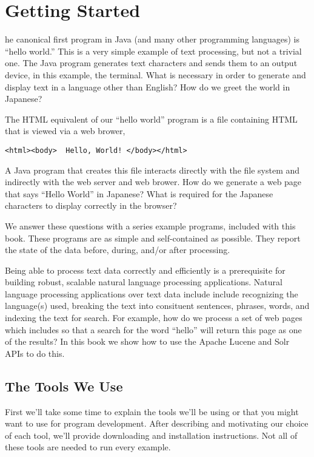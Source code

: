 \chapter{Getting Started}\label{chap:getting-started}

he canonical first program in Java (and many
other programming languages) is ``hello world.''
%
%
This is a very simple example of text processing, but not a trivial one.
The Java program generates text characters and sends them to an output device,
in this example, the terminal.
What is necessary in order to generate and display text in a language other than English?
How do we greet the world in Japanese?

The HTML equivalent of our ``hello world'' program is a file containing
HTML that is viewed via a web brower, 
\begin{verbatim}
<html><body>  Hello, World! </body></html>
\end{verbatim}
A Java program that creates this file interacts directly with the file system
and indirectly with the web server and web brower.  How do we generate a web page 
that says ``Hello World'' in Japanese?  What is required 
for the Japanese characters to display correctly in the browser?

We answer these questions with a series example programs,
included with this book.
These programs are as simple and self-contained as possible.
They report the state of the data before, during, and/or after processing.

Being able to process text data correctly and efficiently is a prerequisite
for building robust, scalable natural language processing applications.
Natural language processing applications over text data include
include recognizing the language(s) used,
breaking the text into consituent sentences, phrases, words, and indexing
the text for search.
For example, how do we process a set of web pages
which includes  so that a search for the word ``hello''
will return this page as one of the results?
In this book we show how to use the Apache Lucene and Solr APIs to do this.

\section{The Tools We Use}

First we'll take some time to explain the tools we'll be using or that
you might want to use for program development.
After describing and motivating our choice of each tool,
we'll provide downloading and installation instructions.
Not all of these tools are needed to run every example.

